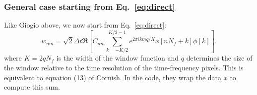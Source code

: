 \documentclass{article}
\begin{document}
\subsubsection{General case starting from Eq.~\eqref{eq:direct}}


Like Giogio above, we now start from Eq.~\eqref{eq:direct}:
\begin{equation}
w_{n m}=\sqrt{2} \Delta t \Re \left[C_{n m} \sum_{k=-K / 2}^{K / 2-1} e^{2\pi i k m q / K} x\left[n N_f+k\right] \phi[k]\right].
\end{equation}
where $K = 2q N_f$ is the width of the window function and $q$ determines the size of the window relative to the time resolution of the time-frequency pixels. This is equivalent to equation (13) of Cornish. In the code, they wrap the data $x$ to compute this sum.
\end{document}
